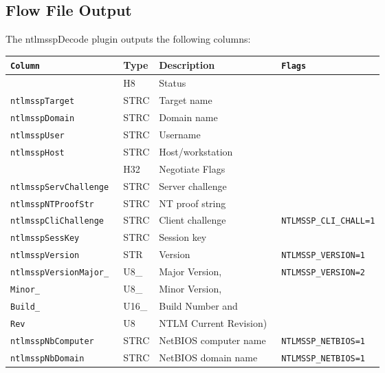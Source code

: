 \documentclass[documentation]{subfiles}
\begin{document}
\subsection{Flow File Output}
The ntlmsspDecode plugin outputs the following columns:
\begin{longtable}{>{\tt}lll>{\tt\small}l}
    \toprule
    {\bf Column} & {\bf Type} & {\bf Description} & {\bf Flags}\\
    \midrule\endhead%
    \nameref{ntlmsspStat}           & H8           & Status                        & \\
    ntlmsspTarget                   & STRC         & Target name                   & \\
    ntlmsspDomain                   & STRC         & Domain name                   & \\
    ntlmsspUser                     & STRC         & Username                      & \\
    ntlmsspHost                     & STRC         & Host/workstation              & \\
    \nameref{ntlmsspNegotiateFlags} & H32          & Negotiate Flags               & \\
    ntlmsspServChallenge            & STRC         & Server challenge              & \\
    ntlmsspNTProofStr               & STRC         & NT proof string               & \\
    ntlmsspCliChallenge             & STRC         & Client challenge              & NTLMSSP\_CLI\_CHALL=1\\
    ntlmsspSessKey                  & STRC         & Session key                   & \\
    ntlmsspVersion                  & STR          & Version                       & NTLMSSP\_VERSION=1\\
    ntlmsspVersionMajor\_           & U8\_         & Major Version,                & NTLMSSP\_VERSION=2\\
    \qquad Minor\_                  & \qquad U8\_  & \qquad Minor Version,         & \\
    \qquad Build\_                  & \qquad U16\_ & \qquad Build Number and       & \\
    \qquad Rev                      & \qquad U8    & \qquad NTLM Current Revision) & \\
    ntlmsspNbComputer               & STRC         & NetBIOS computer name         & NTLMSSP\_NETBIOS=1\\
    ntlmsspNbDomain                 & STRC         & NetBIOS domain name           & NTLMSSP\_NETBIOS=1\\

\end{longtable}
\end{document}
